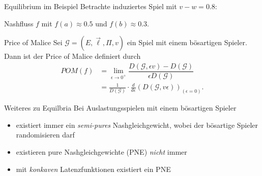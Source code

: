 \documentclass{beamer}
\begin{document}
\begin{frame}{Equilibrium im Beispiel}
	Betrachte induziertes Spiel mit $v-w=0.8$:
	
	\begin{figure}
	\end{figure}
	Nashfluss $f$ mit $f(a) \approx 0.5$ und $f(b) \approx 0.3$.
\end{frame}

\begin{frame}{Price of Malice}
	Sei $\mathcal G = (E, \vec{\ell}, \Pi, v)$ ein Spiel mit einem bösartigen Spieler.
	Dann ist der \alert{Price of Malice} definiert durch
	\begin{align*}
		POM(f) &= \lim_{\epsilon \to 0^+} \dfrac{D(\mathcal G, \epsilon v) - D(\mathcal G)}{\epsilon D(\mathcal G)}  \\
		&= \frac{1}{D(\mathcal G)} \cdot \frac{d}{d \epsilon}(D(\mathcal G, v \epsilon))_{(\epsilon = 0)}.
	\end{align*}
\end{frame}

\begin{frame}{Weiteres zu Equilbria}
	Bei Auslastungsspielen mit einem bösartigen Spieler 
	\begin{itemize}
		\item existiert immer ein \emph{semi-pures} Nashgleichgewicht, wobei der bösartige Spieler randomisieren darf
		\item existieren pure Nashgleichgewichte (PNE) \emph{nicht} immer
		\item mit \emph{konkaven} Latenzfunktionen existiert ein PNE
	\end{itemize}
\end{frame}
\end{document}
